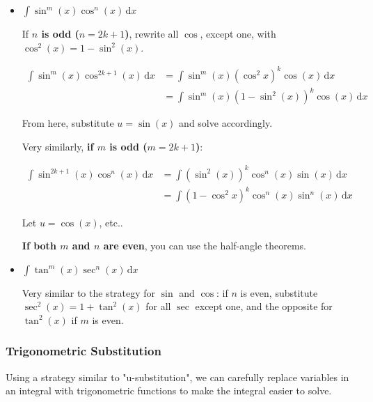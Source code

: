 \documentclass[12pt]{article}
\begin{document}
\begin{itemize}
    \item $\int \sin^m(x)\cos^n(x) \,\text{d}x$
    
    If \textbf{$n$ is odd ($n=2k+1$)}, rewrite all $\cos$, except one, with $\cos^2(x)=1-\sin^2(x)$.
        
        \begin{equation}
            \begin{split}
                \int \sin^{m}(x) \cos^{2k+1}(x) \,\text{d}x &= \int \sin^m(x)(\cos^2x)^k\cos(x) \,\text{d}x\\
                &= \int \sin^m(x)(1-\sin^2(x))^k\cos(x) \,\text{d}x
            \end{split}
        \end{equation}
        
        From here, substitute $u=\sin(x)$ and solve accordingly.
        
        Very similarly, \textbf{if $m$ is odd ($m=2k+1$)}:
        
        \begin{equation}
            \begin{split}
                \int \sin^{2k+1}(x) \cos^{n}(x) \,\text{d}x &= \int (\sin^2(x))^k \cos^n(x) \sin(x) \,\text{d}x\\
                &= \int (1-\cos^2x)^k\cos^n(x)\sin^n(x)\, \text{d}x
            \end{split}
        \end{equation}
        
        Let $u = \cos(x)$, etc..

        \textbf{If both $m$ and $n$ are even}, you can use the half-angle theorems.
        
    \item $\int \tan^m(x)\sec^n(x) \,\text{d}x$
    
    Very similar to the strategy for $\sin$ and $\cos$: if $n$ is even, substitute $\sec^2(x) = 1+\tan^2(x)$ for all $\sec$ except one, and the opposite for $\tan^2(x)$ if $m$ is even.
\end{itemize}

\subsubsection{Trigonometric Substitution}

Using a strategy similar to "u-substitution", we can carefully replace variables in an integral with trigonometric functions to make the integral easier to solve.
\end{document}
